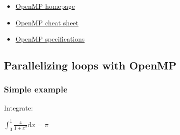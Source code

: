 \begin{itemize}
\itemsep1pt\parskip0pt
\item
  \href{http://openmp.org/}{OpenMP homepage}
\item
  \href{http://openmp.org/mp-documents/OpenMP-4.0-C.pdf}{OpenMP cheat
  sheet}
\item
  \href{http://openmp.org/wp/openmp-specifications/}{OpenMP
  specifications}
\end{itemize}

\subsection{Parallelizing loops with
OpenMP}\label{parallelizing-loops-with-openmp}

\subsubsection{Simple example}\label{simple-example}

Integrate:

$\int_0^1 \frac{4}{1+x^2} \mathrm{d}x=\pi$

\begin{Shaded}
\begin{Highlighting}[]

   
\NormalTok{\{}
     
      \NormalTok{;}
      

    \NormalTok{;}
    \NormalTok{;}
    \NormalTok{\{}
         \NormalTok{(} 
        \NormalTok{\{}
            \NormalTok{);}
            \NormalTok{/(} 
        \NormalTok{\}}
        \NormalTok{\{}
        \NormalTok{\}}
    \NormalTok{\}}
     
\NormalTok{\}}
\end{Highlighting}
\end{Shaded}

